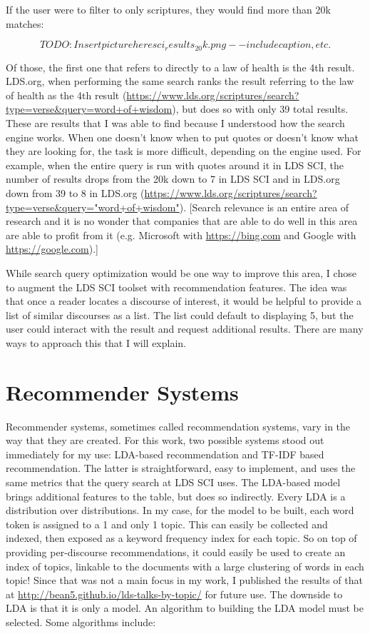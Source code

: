 If the user were to filter to only scriptures, they would find more than 20k matches:

\[TODO: Insert picture here sci_results_20k.png--include caption, etc.\]

Of those, the first one that refers to directly to a law of health is the 4th result. LDS.org, when performing the same search ranks the result referring to the law of health as the 4th result (\url{https://www.lds.org/scriptures/search?type=verse&query=word+of+wisdom}), but does so with only 39 total results. These are results that I was able to find because I understood how the search engine works. When one doesn’t know when to put quotes or doesn’t know what they are looking for, the task is more difficult, depending on the engine used. For example, when the entire query is run with quotes around it in LDS SCI, the number of results drops from the 20k down to 7 in LDS SCI and in LDS.org down from 39 to 8 in LDS.org (\url{https://www.lds.org/scriptures/search?type=verse&query="word+of+wisdom"}). [Search relevance is an entire area of research and it is no wonder that companies that are able to do well in this area are able to profit from it (e.g. Microsoft with \url{https://bing.com} and Google with \url{https://google.com}).]

While search query optimization would be one way to improve this area, I chose to augment the LDS SCI toolset with recommendation features. The idea was that once a reader locates a discourse of interest, it would be helpful to provide a list of similar discourses as a list. The list could default to displaying 5, but the user could interact with the result and request additional results. There are many ways to approach this that I will explain.

\section{Recommender Systems}
Recommender systems, sometimes called recommendation systems, vary in the way that they are created. For this work, two possible systems stood out immediately for my use: LDA-based recommendation and TF-IDF based recommendation. The latter is straightforward, easy to implement, and uses the same metrics that the query search at LDS SCI uses. The LDA-based model brings additional features to the table, but does so indirectly. Every LDA is a distribution over distributions. In my case, for the model to be built, each word token is assigned to a 1 and only 1 topic. This can easily be collected and indexed, then exposed as a keyword frequency index for each topic. So on top of providing per-discourse recommendations, it could easily be used to create an index of topics, linkable to the documents with a large clustering of words in each topic! Since that was not a main focus in my work, I published the results of that at \url{http://bean5.github.io/lds-talks-by-topic/} for future use. The downside to LDA is that it is only a model. An algorithm to building the LDA model must be selected. Some algorithms include:

